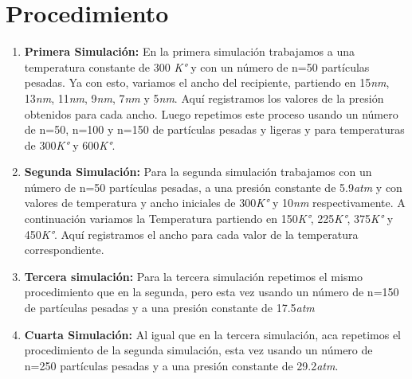 \documentclass[../portafolio.tex]{subfiles}
\begin{document}
\section{Procedimiento}
\begin{enumerate}
    \item \textbf{Primera Simulación:} En la primera simulación trabajamos a una temperatura constante de 300 \textit{K°}  y con un número de n=50 partículas pesadas. Ya con esto, variamos el ancho del recipiente, partiendo en 15\textit{nm}, 13\textit{nm}, 11\textit{nm}, 9\textit{nm}, 7\textit{nm} y 5\textit{nm}. Aquí registramos los valores de la presión obtenidos para cada ancho. Luego repetimos este proceso usando un número de n=50, n=100 y n=150 de partículas pesadas y ligeras y para temperaturas de 300\textit{K°} y 600\textit{K°}.
    \item \textbf{Segunda Simulación:} Para la segunda simulación trabajamos con un número de n=50 partículas pesadas, a una presión constante de 5.9\textit{atm} y con valores de temperatura y ancho iniciales de 300\textit{K°} y 10\textit{nm} respectivamente. A continuación variamos la Temperatura partiendo en 150\textit{K°}, 225\textit{K°}, 375\textit{K°} y 450\textit{K°}. Aquí registramos el ancho para cada valor de la temperatura correspondiente.
    \item \textbf{Tercera simulación:} Para la tercera simulación repetimos el mismo procedimiento que en la segunda, pero esta vez usando un número de n=150 de partículas pesadas y a una presión constante de 17.5\textit{atm}
    \item \textbf{Cuarta Simulación:} Al igual que en la tercera simulación, aca repetimos el procedimiento de la segunda simulación, esta vez usando un número de n=250 partículas pesadas y a una presión constante de  29.2\textit{atm}.
\end{enumerate}
\end{document}
